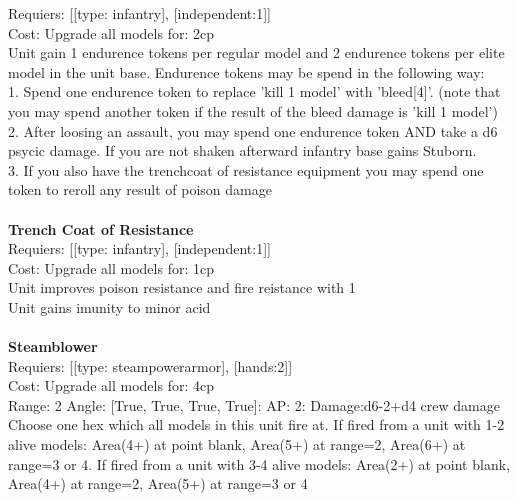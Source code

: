 Requiers: [[type: infantry], [independent:1]] \\
Cost: Upgrade all models for: 2cp \\
Unit gain 1 endurence tokens per regular model  and 2 endurence tokens per elite model in the unit base. Endurence tokens may be spend in the following way:\\ 
1. Spend one endurence token to replace 'kill 1 model' with 'bleed[4]'. (note that you may spend another token if the result of the bleed damage is 'kill 1 model')\\ 
2. After loosing an assault, you may spend one endurence token AND take a d6 psycic damage. If you are not shaken afterward infantry base gains Stuborn.\\ 
3. If you also have the trenchcoat of resistance equipment you may spend one token to reroll any result of poison damage\\ 









\ \\
{\bf Trench Coat of Resistance } \\

Requiers: [[type: infantry], [independent:1]] \\
Cost: Upgrade all models for: 1cp \\
Unit improves poison resistance and fire reistance with 1\\ 
Unit gains imunity to minor acid\\ 









\ \\
{\bf Steamblower } \\

Requiers: [[type: steampowerarmor], [hands:2]] \\
Cost: Upgrade all models for: 4cp \\


Range: 2  Angle: [True, True, True, True]: AP: 2: Damage:d6-2+d4 crew damage \\
Choose one hex which all models in this unit fire at. If fired from a unit with 1-2 alive models: Area(4+) at point blank, Area(5+) at range=2, Area(6+) at range=3 or 4. If fired from a unit with 3-4 alive models: Area(2+) at point blank, Area(4+) at range=2, Area(5+) at range=3 or 4\\ 








